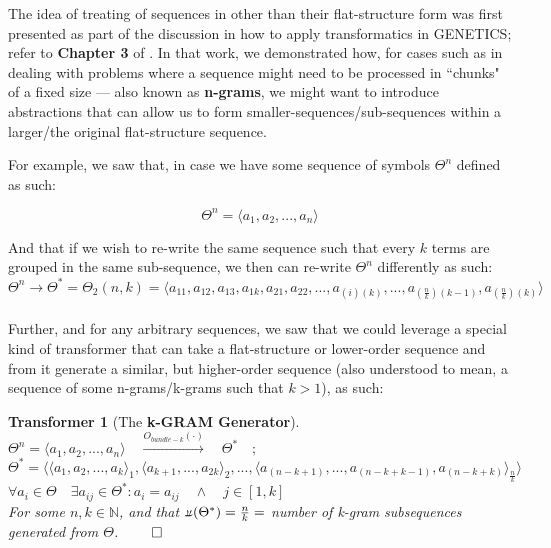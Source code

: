 \documentclass[12pt,a4paper]{article}
\newtheorem{transf}{Transformer}
\newcommand{\invpi}[1]{\mathop{\rotatebox[origin=c]{180}{$\pi$}}#1}
\begin{document}
The idea of treating of sequences in other than their flat-structure form was first presented as part of the discussion in how to apply transformatics in GENETICS\cite{lutalo_2025_trans_genetics}; refer to \textbf{Chapter 3} of \cite{lutalo_2025_trans_genetics}. In that work, we demonstrated how, for cases such as in dealing with problems where a sequence might need to be processed in ``chunks" of a fixed size --- also known as \textbf{n-grams}, we might want to introduce abstractions that can allow us to form smaller-sequences/sub-sequences within a larger/the original flat-structure sequence.

For example, we saw that, in case we have some sequence of symbols $\Theta^n$ defined as such:

\begin{equation}
\label{EQSEQ1}
\Theta^n = \langle a_1, a_2,...,a_n\rangle
\end{equation}

And that if we wish to re-write the same sequence such that every $k$ terms are grouped in the same sub-sequence, we then can re-write $\Theta^n$ differently as such:\\


\begin{equation}
\label{EQSEQ2}
\Theta^n \rightarrow \Theta^* = \Theta_2(n,k) = \langle a_{11}, a_{12}, a_{13}, a_{1k}, a_{21}, a_{22},...,a_{(i)(k)},...,a_{(\frac{n}{k})(k-1)},a_{(\frac{n}{k})(k)}\rangle
\end{equation}\\


Further, and for any arbitrary sequences, we saw that we could leverage a special kind of transformer that can take a flat-structure or lower-order sequence and from it generate a similar, but higher-order sequence (also understood to mean, a sequence of some n-grams/k-grams such that $k > 1$), as such:\\


\begin{transf}[The \textbf{k-GRAM Generator}]
\label{TRANSFBUND}
$\Theta^n = \langle a_1, a_2,...,a_n\rangle \quad \xrightarrow{O_{bundle-k}(\cdot)} \quad \Theta^* \quad;$\\
$\Theta^* = \langle \langle a_1, a_2,..., a_k \rangle_1, \langle a_{k+1},...,a_{2k} \rangle_2,... , \langle a_{(n-k+1)},...,a_{(n-k+k-1)},a_{(n-k+k)}\rangle_{\frac{n}{k}} \rangle$\\
$\forall a_i \in \Theta \quad \exists a_{ij} \in \Theta^*: a_i = a_{ij} \quad \land \quad j \in [1,k]$\\
For some $n, k \in \mathbb{N}$, and that $\invpi(\Theta^*) = \frac{n}{k} = $ number of k-gram subsequences generated from $\Theta$. $\qed$\\
\end{transf}
\end{document}
